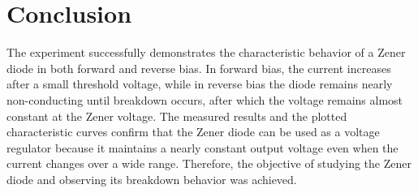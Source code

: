 \section{Conclusion}

The experiment successfully demonstrates the characteristic behavior of a Zener diode in both forward and reverse bias. In forward bias, the current increases after a small threshold voltage, while in reverse bias the diode remains nearly non-conducting until breakdown occurs, after which the voltage remains almost constant at the Zener voltage. The measured results and the plotted characteristic curves confirm that the Zener diode can be used as a voltage regulator because it maintains a nearly constant output voltage even when the current changes over a wide range. Therefore, the objective of studying the Zener diode and observing its breakdown behavior was achieved.




